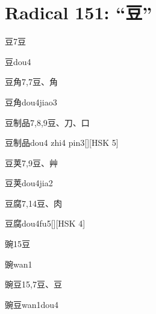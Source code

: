 
\section*{Radical 151: ``⾖''}

\begin{entry}{豆}{7}{⾖}
  \begin{phonetics}{豆}{dou4}
  \end{phonetics}
\end{entry}

\begin{entry}{豆角}{7,7}{⾖、⾓}
  \begin{phonetics}{豆角}{dou4jiao3}
  \end{phonetics}
\end{entry}

\begin{entry}{豆制品}{7,8,9}{⾖、⼑、⼝}
  \begin{phonetics}{豆制品}{dou4 zhi4 pin3}[][HSK 5]
  \end{phonetics}
\end{entry}

\begin{entry}{豆荚}{7,9}{⾖、⾋}
  \begin{phonetics}{豆荚}{dou4jia2}
  \end{phonetics}
\end{entry}

\begin{entry}{豆腐}{7,14}{⾖、⾁}
  \begin{phonetics}{豆腐}{dou4fu5}[][HSK 4]
  \end{phonetics}
\end{entry}

\begin{entry}{豌}{15}{⾖}
  \begin{phonetics}{豌}{wan1}
  \end{phonetics}
\end{entry}

\begin{entry}{豌豆}{15,7}{⾖、⾖}
  \begin{phonetics}{豌豆}{wan1dou4}
  \end{phonetics}
\end{entry}


